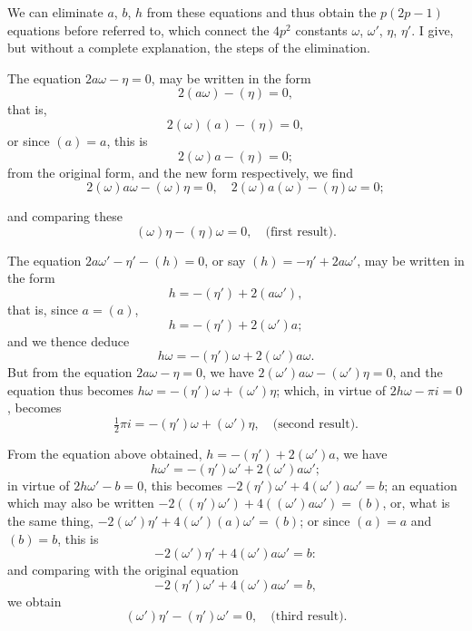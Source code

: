 \documentclass[11pt,a4paper]{article}
\begin{document}
We can eliminate $a$, $b$, $h$ from these equations and thus obtain the
$p(2p - 1)$ equations before referred to, which connect the $4p^{2}$
constants $\omega$, $\omega'$, $\eta$, $\eta'$.  I give, but without a
complete explanation, the steps of the elimination.

The equation $2a\omega - \eta = 0$, may be written in the form
\[
  2(a\omega) - (\eta) = 0,
\]
that is,
\[
  2(\omega)(a) - (\eta) = 0,
\]
or since $(a) = a$, this is
\[
  2(\omega)a - (\eta) = 0;
\]
from the original form, and the new form respectively, we find
\[
  2(\omega) a\omega - (\omega)\eta = 0, \quad
  2(\omega) a(\omega) - (\eta)\omega = 0;
\]

and comparing these
\[
  (\omega)\eta - (\eta)\omega = 0, \quad \text{(first result).}
\]

The equation $2a\omega' - \eta' - (h) = 0$, or say
$(h) = -\eta' + 2a\omega'$, may be written in the form
\[
  h = -(\eta') + 2(a\omega'),
\]
that is, since $a = (a)$,
\[
  h = -(\eta') + 2(\omega')a;
\]
and we thence deduce
\[
  h\omega = -(\eta')\omega + 2(\omega')a\omega.
\]
But from the equation $2a\omega - \eta = 0$, we have
$2(\omega')a\omega - (\omega')\eta = 0$, and the equation thus becomes
$h\omega = -(\eta')\omega + (\omega')\eta$; which, in virtue of
$2h\omega - \pi i = 0$, becomes
\[
  \tfrac{1}{2}\pi i = -(\eta')\omega + (\omega')\eta, \quad
  \text{(second result).}
\]

From the equation above obtained, $h = -(\eta') + 2(\omega')a$, we have
\[
  h\omega' = -(\eta')\omega' + 2(\omega')a\omega';
\]
in virtue of $2h\omega' - b = 0$, this becomes
$-2(\eta')\omega' + 4(\omega')a\omega' = b$; an equation which may also be
written $-2((\eta')\omega') + 4((\omega')a\omega') = (b)$, or, what is the
same thing, $-2(\omega')\eta' + 4(\omega')(a)\omega' = (b)$; or since
$(a) = a$ and $(b) = b$, this is
\[
  -2(\omega')\eta' + 4(\omega')a\omega' = b:
\]
and comparing with the original equation
\[
  -2(\eta')\omega' + 4(\omega')a\omega' = b,
\]
we obtain
\[
  (\omega')\eta' - (\eta')\omega' = 0, \quad \text{(third result).}
\]
\end{document}
